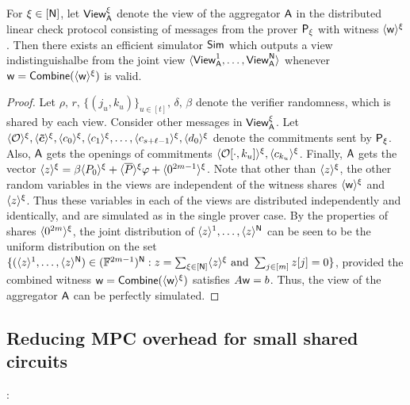 \begin{lemma}\label{lem:distlincheckzk}
	For $\xi\in [\mathsf{N}]$, let $\mathsf{View}^\xi_{\mathsf{A}}$ denote the view of the aggregator $\mathsf{A}$ in the distributed
	linear check protocol consisting of messages from the prover $\mathsf{P}_\xi$ with
	witness $\langle{\mathsf{w}}\rangle^\xi$. Then there exists an efficient simulator $\mathsf{Sim}$
	which outputs a view indistinguishalbe from the joint view $\langle
	\mathsf{View}^1_{\mathsf{A}},\ldots,\mathsf{View}^{\mathsf{N}}_{\mathsf{A}}\rangle$ whenever
$\mathsf{w}=\mathsf{Combine}(\langle{\mathsf{w}}\rangle^\xi)$ is valid.
\end{lemma}
\begin{proof}
	
	Let  $\rho, \, r, \, \{(j_u,k_u)\}_{u\in[t]}, \, \delta, \, \beta$ denote the verifier
	randomness, which is shared by each view. Consider other messages in
	$\mathsf{View}^\xi_{\mathsf{A}}$. Let $\langle{\mathcal{O}}\rangle^\xi, \langle{\bm{\tilde{c}}}\rangle^\xi, \langle{c_0}\rangle^\xi, \langle{c_1}\rangle^\xi, \ldots, \langle{c_{s+\ell-1}}\rangle^\xi, \langle{d_0}\rangle^\xi$ 
	denote the commitments sent by $\mathsf{P}_\xi$. Also, $\mathsf{A}$ gets the openings
of commitments $\langle{\mathcal{O}[\cdot,k_u]}\rangle^\xi, \langle{c_{k_u}}\rangle^\xi$.
	Finally, $\mathsf{A}$ gets the vector $\langle{z}\rangle^\xi = \beta\langle{P_0}\rangle^\xi + \langle{\overline{P}}\rangle^\xi\varphi + \langle{0^{2m-1}}\rangle^\xi$.
	Note that other than $\langle{z}\rangle^\xi$, the other random variables in the views are
independent of the witness shares $\langle{\mathsf{w}}\rangle^\xi$ and $\langle{z}\rangle^\xi$. Thus these
variables in each of the views are distributed independently and identically,
and are simulated as in the single prover case. By the properties of shares
$\langle{0^{2m}}\rangle^\xi$, the joint distribution of $\langle{z}\rangle^1,\ldots,\langle{z}\rangle^{\mathsf{N}}$ 
can be seen to be the uniform distribution on the set
$\{(\langle{z}\rangle^1,\ldots,\langle{z}\rangle^{\mathsf{N}})\in (\mathbb{F}^{2m-1})^{\mathsf{N}}:
z=\sum_{\xi\in[\mathsf{N}]}\langle{z}\rangle^\xi \text{ and } \sum_{j\in[m]} z[j]=0 \}$, provided
the combined witness $\mathsf{w}=\mathsf{Combine}(\langle{\mathsf{w}}\rangle^\xi)$ satisfies $A\mathsf{w}=b$. 
Thus, the view of the aggregator $\mathsf{A}$ can be perfectly simulated.
\end{proof}

\subsection{Reducing MPC overhead for small shared circuits}:


